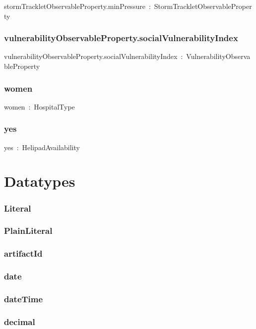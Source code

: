 \documentclass{article}
\begin{document}
stormTrackletObservableProperty.minPressure~:~StormTrackletObservableProperty

\subsubsection*{vulnerabilityObservableProperty.socialVulnerabilityIndex}

vulnerabilityObservableProperty.socialVulnerabilityIndex~:~VulnerabilityObservableProperty

\subsubsection*{women}

women~:~HospitalType

\subsubsection*{yes}

yes~:~HelipadAvailability

\section*{Datatypes}\subsubsection*{Literal}

\subsubsection*{PlainLiteral}

\subsubsection*{artifactId}

\subsubsection*{date}

\subsubsection*{dateTime}

\subsubsection*{decimal}
\end{document}
